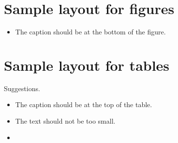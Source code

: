\documentclass[10pt,twocolumn,letterpaper]{article}
\begin{document}
\clearpage
\section{Sample layout for figures}
\begin{itemize}
    \item The caption should be at the bottom of the figure. 
\end{itemize}


\clearpage
\section{Sample layout for tables}
Suggestions.
\begin{itemize}
    \item The caption should be at the top of the table.
    \item The text should not be too small.
    \item 
\end{itemize}


















 
\clearpage
{\small


}
\end{document}
